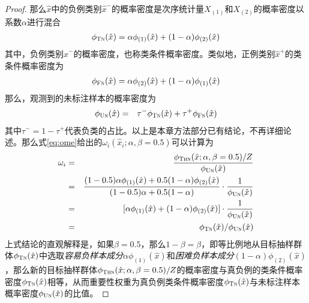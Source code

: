 \begin{theorem}[后验概率估计]
\begin{proof}
那么$\hat{x}$中的负例类别$\hat x^-$的概率密度是次序统计量$X_{(1)}$和$X_{(2)}$的概率密度以系数$\alpha$进行混合
\begin{eqnarray}
	\phi_{\textsc{Tn}}(\hat{x}) = \alpha \phi_{(1)}(\hat{x}) + (1-\alpha)\phi_{(2)}(\hat{x}) \nonumber
\end{eqnarray}
其中，负例类别$\hat x^-$的概率密度，也称类条件概率密度。类似地，正例类别$\hat x^+$的类条件概率密度为
\begin{eqnarray}
	\phi_{\textsc{Fn}}(\hat{x}) = \alpha \phi_{(2)}(\hat{x}) + (1-\alpha)\phi_{(1)}(\hat{x})\nonumber
\end{eqnarray}
那么，观测到的未标注样本的概率密度为
\begin{eqnarray}
	\phi_{\textsc{Un}}(\hat{x}) &=& \tau^-\phi_{\textsc{Tn}}(\hat{x}) +\tau^+\phi_{\textsc{Fn}}(\hat{x}) \nonumber 
\end{eqnarray} 
其中$\tau^- = 1- \tau^+$代表负类的占比。以上是本章方法部分已有结论，不再详细论述。那么式\eqref{eq:ome}给出的$\omega_i(\hat{x}_i;\alpha,\beta=0.5)$可以计算为
\begin{eqnarray}
	\omega_i&=& \frac{\phi_\textsc{Thn}(\hat{x};\alpha, \beta=0.5)/Z}{\phi_{\textsc{Un}}(\hat{x})}  \nonumber \\
 &=&\frac{ (1-0.5)\alpha  \phi_{(1)}(\hat{x}) +0.5 (1-\alpha)  \phi_{(2)}(\hat{x}) }{(1-0.5)\alpha + 0.5 (1-\alpha)} \cdot \frac{1}{\phi_{\textsc{Un}}(\hat{x})}\nonumber\\
	&=& [\alpha\phi_{(1)}(\hat{x})+(1-\alpha)  \phi_{(2)}(\hat{x})] \cdot  \frac{1}{\phi_{\textsc{Un}}(\hat{x})} \nonumber\\
	&=& \phi_\textsc{Tn}(\hat{x})/ \phi_{\textsc{Un}}(\hat{x})\label{eq:ratio}
\end{eqnarray}
上式结论的直观解释是，如果$\beta=0.5$，那么$1-\beta = \beta$，即等比例地从目标抽样群体$\phi_{\textsc{Tn}}(\hat{x})$中选取\textit{容易负样本成分}$\alpha  \phi_{(1)}(\hat{x})$和\textit{困难负样本成分}$(1-\alpha)  \phi_{(2)}(\hat{x})$，那么新的目标抽样群体$\phi_\textsc{Thn}(\hat{x};\alpha, \beta=0.5)/Z$的概率密度与真负例的类条件概率密度$\phi_\textsc{Tn}(\hat{x})$相等，从而重要性权重为真负例类条件概率密度$\phi_\textsc{Tn}(\hat{x})$与未标注样本概率密度$\phi_{\textsc{Un}}(\hat{x})$的比值。


\end{proof}
\end{theorem}
